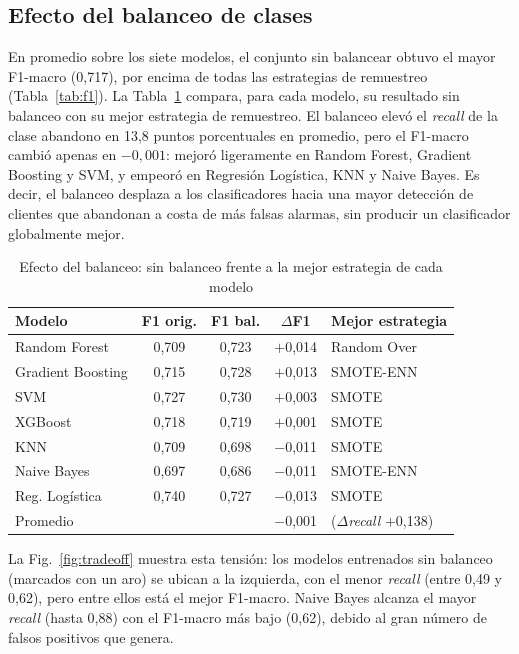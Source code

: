 \documentclass[conference]{IEEEtran}
\begin{document}
\subsection{Efecto del balanceo de clases}

En promedio sobre los siete modelos, el conjunto sin balancear obtuvo el mayor F1-macro (0,717), por encima de todas las estrategias de remuestreo (Tabla~\ref{tab:f1}). La Tabla~\ref{tab:delta} compara, para cada modelo, su resultado sin balanceo con su mejor estrategia de remuestreo. El balanceo elevó el \emph{recall} de la clase abandono en 13,8 puntos porcentuales en promedio, pero el F1-macro cambió apenas en $-0{,}001$: mejoró ligeramente en Random Forest, Gradient Boosting y SVM, y empeoró en Regresión Logística, KNN y Naive Bayes. Es decir, el balanceo desplaza a los clasificadores hacia una mayor detección de clientes que abandonan a costa de más falsas alarmas, sin producir un clasificador globalmente mejor.

\begin{table}[!t]
\caption{Efecto del balanceo: sin balanceo frente a la mejor estrategia de cada modelo}
\label{tab:delta}
\centering
\footnotesize
\setlength{\tabcolsep}{3.5pt}
\begin{tabular}{@{}lcccl@{}}
\toprule
Modelo & F1 orig. & F1 bal. & $\Delta$F1 & Mejor estrategia \\
\midrule
Random Forest & 0,709 & 0,723 & $+$0,014 & Random Over \\
Gradient Boosting & 0,715 & 0,728 & $+$0,013 & SMOTE-ENN \\
SVM & 0,727 & 0,730 & $+$0,003 & SMOTE \\
XGBoost & 0,718 & 0,719 & $+$0,001 & SMOTE \\
KNN & 0,709 & 0,698 & $-$0,011 & SMOTE \\
Naive Bayes & 0,697 & 0,686 & $-$0,011 & SMOTE-ENN \\
Reg. Logística & 0,740 & 0,727 & $-$0,013 & SMOTE \\
\midrule
Promedio & & & $-$0,001 & ($\Delta$\emph{recall} $+$0,138) \\
\bottomrule
\end{tabular}
\end{table}

La Fig.~\ref{fig:tradeoff} muestra esta tensión: los modelos entrenados sin balanceo (marcados con un aro) se ubican a la izquierda, con el menor \emph{recall} (entre 0,49 y 0,62), pero entre ellos está el mejor F1-macro. Naive Bayes alcanza el mayor \emph{recall} (hasta 0,88) con el F1-macro más bajo (0,62), debido al gran número de falsos positivos que genera.
\end{document}
